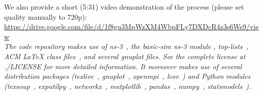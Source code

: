 \noindent We also provide a short (5:31) video demonstration of the process (please set quality manually to 720p):\\

\noindent\url{https://drive.google.com/file/d/1f8gu3MpWzXM4WbpFLy7DXDcR4z3s6Ws9/view}\\

\noindent \textit{The code repository makes use of ns-3~\cite{ns3}, the basic-sim ns-3 module \cite{basic-sim}, top-lists~\cite{top-lists}, ACM LaTeX class files~\cite{acm-latex}, and several gnuplot files. See the complete license at ./LICENSE for more detailed information. It moreover makes use of several distribution packages (texlive~\cite{texlive}, gnuplot~\cite{gnuplot}, openmpi~\cite{openmpi}, lcov~\cite{lcov}) and Python modules (texsoup~\cite{texsoup}, exputilpy~\cite{exputilpy}, networkx~\cite{networkx}, matplotlib~\cite{matplotlib}, pandas~\cite{pandas}, numpy~\cite{numpy}, statsmodels~\cite{statsmodels}).}
